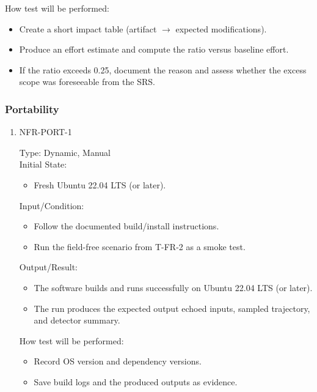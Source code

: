 \documentclass[12pt, titlepage]{article}
\begin{document}
\begin{enumerate}
How test will be performed:
\begin{itemize}
  \item Create a short impact table (artifact $\rightarrow$ expected modifications).
  \item Produce an effort estimate and compute the ratio versus baseline effort.
  \item If the ratio exceeds 0.25, document the reason and assess whether the
        excess scope was foreseeable from the SRS.
\end{itemize}

\end{enumerate}


\subsubsection{Portability}

\begin{enumerate}

\item{NFR-PORT-1\\}

Type: Dynamic, Manual\\

Initial State:
\begin{itemize}
  \item Fresh Ubuntu 22.04 LTS (or later).
\end{itemize}

Input/Condition:
\begin{itemize}
  \item Follow the documented build/install instructions.
  \item Run the field-free scenario from T-FR-2 as a smoke test.
\end{itemize}

Output/Result:
\begin{itemize}
  \item The software builds and runs successfully on Ubuntu 22.04 LTS (or later).
  \item The run produces the expected output echoed inputs, sampled trajectory, and detector summary.
\end{itemize}

How test will be performed:
\begin{itemize}
  \item Record OS version and dependency versions.
  \item Save build logs and the produced outputs as evidence.
\end{itemize}

\end{enumerate}
\end{document}
